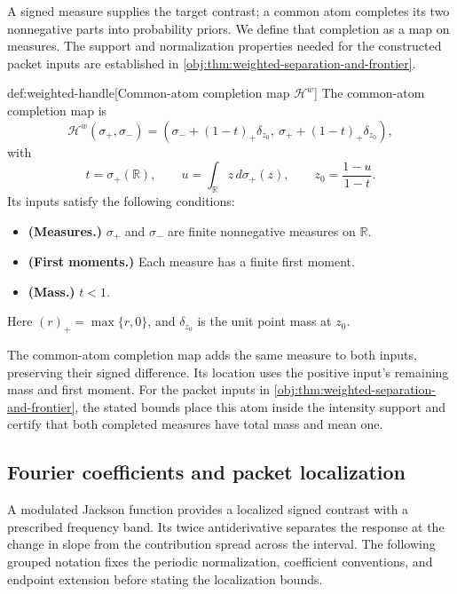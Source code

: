 \documentclass[11pt]{article}
\begin{document}
A signed measure supplies the target contrast; a common atom completes its two nonnegative parts into probability priors. We define that completion as a map on measures. The support and normalization properties needed for the constructed packet inputs are established in \cref{obj:thm:weighted-separation-and-frontier}.

\begin{definitionv}{def:weighted-handle}[Common-atom completion map \(\mathscr H^w\)]
The common-atom completion map is
\[
\mathscr H^w(\sigma_+,\sigma_-)
=
\left(
\sigma_-+(1-t)_+\delta_{z_0},
\ \sigma_++(1-t)_+\delta_{z_0}
\right),
\]
with
\[
t=\sigma_+(\mathbb R),
\qquad
u=\int_{\mathbb R}z\,d\sigma_+(z),
\qquad
z_0=\frac{1-u}{1-t}.
\]
Its inputs satisfy the following conditions:
\begin{itemize}
\item \textbf{(Measures.)} \(\sigma_+\) and \(\sigma_-\) are finite nonnegative measures on \(\mathbb R\).
\item \textbf{(First moments.)} Each measure has a finite first moment.
\item \textbf{(Mass.)} \(t<1\).
\end{itemize}
Here \((r)_+=\max\{r,0\}\), and \(\delta_{z_0}\) is the unit point mass at \(z_0\).
\end{definitionv}

The common-atom completion map  adds the same measure to both inputs, preserving their signed difference. Its location uses the positive input's remaining mass and first moment. For the packet inputs in \cref{obj:thm:weighted-separation-and-frontier}, the stated bounds place this atom inside the intensity support and certify that both completed measures have total mass and mean one.

\subsection{Fourier coefficients and packet localization}

A modulated Jackson function provides a localized signed contrast with a prescribed frequency band. Its twice antiderivative separates the response at the change in slope from the contribution spread across the interval. The following grouped notation fixes the periodic normalization, coefficient conventions, and endpoint extension before stating the localization bounds.
\end{document}
